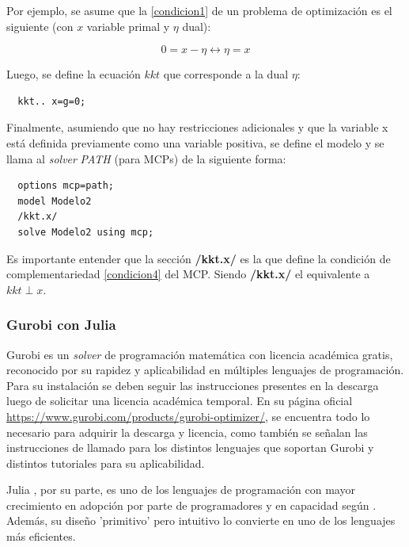 Por ejemplo, se asume que la \ref{condicion1} de un problema de optimización es el siguiente (con $x$ variable primal y $\eta$ dual):

$$0=x-\eta \leftrightarrow \eta=x$$

Luego, se define la ecuación $kkt$ que corresponde a la dual $\eta$:

\begin{lstlisting}
  kkt.. x=g=0;
 \end{lstlisting}

Finalmente, asumiendo que no hay restricciones adicionales y que la variable x está definida previamente como una variable positiva, se define el modelo y se llama al \textit{solver} \textit{PATH} (para MCPs) de la siguiente forma:

\begin{lstlisting}
  options mcp=path;
  model Modelo2
  /kkt.x/
  solve Modelo2 using mcp;
\end{lstlisting}

Es importante entender que la sección \textbf{/kkt.x/} es la que define la condición de complementariedad \ref{condicion4} del MCP. Siendo \textbf{/kkt.x/} el equivalente a  $kkt \perp x$. 

\subsubsection{Gurobi con Julia}

Gurobi \cite{gurobi} es un \textit{solver} de programación matemática con licencia académica gratis, reconocido por su rapidez y aplicabilidad en múltiples lenguajes de programación. Para su instalación se deben seguir las instrucciones presentes en la descarga luego de solicitar una licencia académica temporal. En su página oficial \url{https://www.gurobi.com/products/gurobi-optimizer/}, se encuentra todo lo necesario para adquirir la descarga y licencia, como también se señalan las instrucciones de llamado para los distintos lenguajes que soportan Gurobi y distintos tutoriales para su aplicabilidad.
\vspace{2.5mm}

Julia \cite{julia}, por su parte, es uno de los lenguajes de programación con mayor crecimiento en adopción por parte de programadores y en capacidad según \cite{https://www.hpcwire.com/2021/01/13/julia-update-adoption-keeps-climbing-is-it-a-python-challenger/}. Además, su diseño 'primitivo' pero intuitivo lo convierte en uno de los lenguajes más eficientes. 
\vspace{2.5mm}

